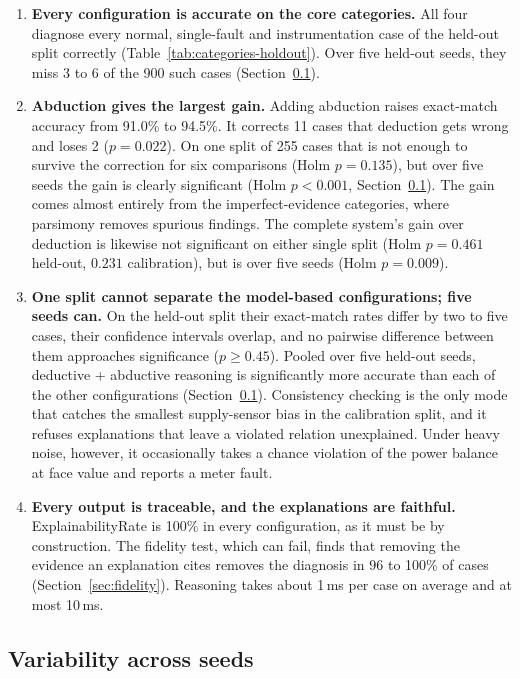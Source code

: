 \begin{enumerate}
  \item \textbf{Every configuration is accurate on the core categories.} All four diagnose every normal, single-fault and instrumentation case of the held-out split correctly (Table~\ref{tab:categories-holdout}). Over five held-out seeds, they miss 3 to 6 of the 900 such cases (Section~\ref{sec:seeds}).
  \item \textbf{Abduction gives the largest gain.} Adding abduction raises exact-match accuracy from 91.0\% to 94.5\%. It corrects 11 cases that deduction gets wrong and loses 2 ($p = 0.022$). On one split of 255 cases that is not enough to survive the correction for six comparisons (Holm $p = 0.135$), but over five seeds the gain is clearly significant (Holm $p < 0.001$, Section~\ref{sec:seeds}). The gain comes almost entirely from the imperfect-evidence categories, where parsimony removes spurious findings. The complete system's gain over deduction is likewise not significant on either single split (Holm $p = 0.461$ held-out, $0.231$ calibration), but is over five seeds (Holm $p = 0.009$).
  \item \textbf{One split cannot separate the model-based configurations; five seeds can.} On the held-out split their exact-match rates differ by two to five cases, their confidence intervals overlap, and no pairwise difference between them approaches significance ($p \ge 0.45$). Pooled over five held-out seeds, deductive + abductive reasoning is significantly more accurate than each of the other configurations (Section~\ref{sec:seeds}). Consistency checking is the only mode that catches the smallest supply-sensor bias in the calibration split, and it refuses explanations that leave a violated relation unexplained. Under heavy noise, however, it occasionally takes a chance violation of the power balance at face value and reports a meter fault.
  \item \textbf{Every output is traceable, and the explanations are faithful.} ExplainabilityRate is 100\% in every configuration, as it must be by construction. The fidelity test, which can fail, finds that removing the evidence an explanation cites removes the diagnosis in 96 to 100\% of cases (Section~\ref{sec:fidelity}). Reasoning takes about 1\,ms per case on average and at most 10\,ms.
\end{enumerate}



\subsection{Variability across seeds}
\label{sec:seeds}

